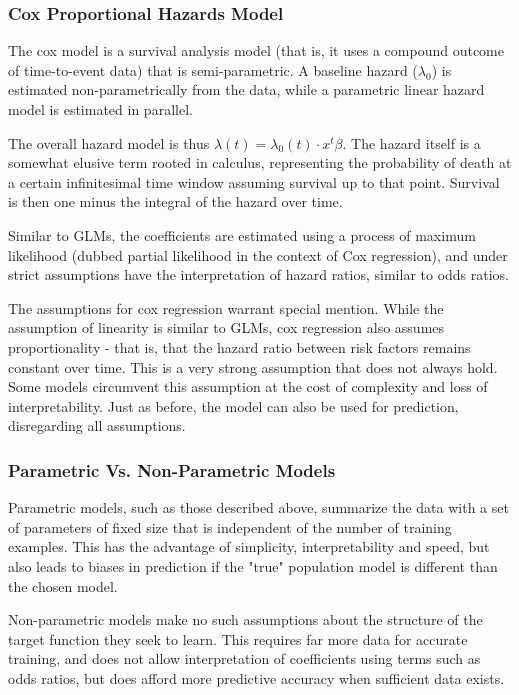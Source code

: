 \documentclass[a4paper,12pt]{article}
\begin{document}
			\subsubsection{Cox Proportional Hazards Model}
			
			The cox model is a survival analysis model (that is, it uses a compound outcome of time-to-event data) that is semi-parametric. A baseline hazard ($ \lambda_0 $) is estimated non-parametrically from the data, while a parametric linear hazard model is estimated in parallel\cite{Cox1972}.
			
			The overall hazard model is thus $ \lambda(t) = \lambda_0(t) \cdot x^t \beta $. The hazard itself is a somewhat elusive term rooted in calculus, representing the probability of death at a certain infinitesimal time window assuming survival up to that point. Survival is then one minus the integral of the hazard over time.
			
			Similar to GLMs, the coefficients are estimated using a process of maximum likelihood (dubbed partial likelihood in the context of Cox regression), and under strict assumptions have the interpretation of hazard ratios, similar to odds ratios.
			
			The assumptions for cox regression warrant special mention. While the assumption of linearity is similar to GLMs, cox regression also assumes proportionality - that is, that the hazard ratio between risk factors remains constant over time. This is a very strong assumption that does not always hold. Some models circumvent this assumption at the cost of complexity and loss of interpretability. Just as before, the model can also be used for prediction, disregarding all assumptions.
			
			\subsubsection{Parametric Vs. Non-Parametric Models}
			Parametric models, such as those described above, summarize the data with a set of parameters of fixed size that is independent of the number of training examples. This has the advantage of simplicity, interpretability and speed, but also leads to biases in prediction if the "true" population model is different than the chosen model.
			
			Non-parametric models make no such assumptions about the structure of the target function they seek to learn. This requires far more data for accurate training, and does not allow interpretation of coefficients using terms such as odds ratios, but does afford more predictive accuracy when sufficient data exists\cite{Russell2002}.
			
\end{document}
